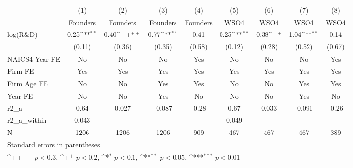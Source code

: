 {
\def\sym#1{\ifmmode^{#1}\else\(^{#1}\)\fi}
\begin{tabular}{l*{8}{c}}
\toprule
                    &\multicolumn{1}{c}{(1)}&\multicolumn{1}{c}{(2)}&\multicolumn{1}{c}{(3)}&\multicolumn{1}{c}{(4)}&\multicolumn{1}{c}{(5)}&\multicolumn{1}{c}{(6)}&\multicolumn{1}{c}{(7)}&\multicolumn{1}{c}{(8)}\\
                    &\multicolumn{1}{c}{Founders}&\multicolumn{1}{c}{Founders}&\multicolumn{1}{c}{Founders}&\multicolumn{1}{c}{Founders}&\multicolumn{1}{c}{WSO4}&\multicolumn{1}{c}{WSO4}&\multicolumn{1}{c}{WSO4}&\multicolumn{1}{c}{WSO4}\\
\midrule
log(R\&D)           &        0.25\sym{**} &        0.40\sym{++} &        0.77\sym{**} &        0.41         &        0.25\sym{**} &        0.38\sym{+}  &        1.04\sym{**} &        0.14         \\
                    &      (0.11)         &      (0.36)         &      (0.35)         &      (0.58)         &      (0.12)         &      (0.28)         &      (0.52)         &      (0.67)         \\
\addlinespace
NAICS4-Year FE      &          No         &          No         &          No         &         Yes         &          No         &          No         &          No         &         Yes         \\
\addlinespace
Firm FE             &         Yes         &         Yes         &         Yes         &         Yes         &         Yes         &         Yes         &         Yes         &         Yes         \\
\addlinespace
Firm Age FE         &          No         &          No         &         Yes         &         Yes         &          No         &          No         &         Yes         &         Yes         \\
\addlinespace
Year FE             &          No         &          No         &         Yes         &          No         &          No         &          No         &         Yes         &          No         \\
\midrule
r2\_a                &        0.64         &       0.027         &      -0.087         &       -0.28         &        0.67         &       0.033         &      -0.091         &       -0.26         \\
r2\_a\_within         &       0.043         &                     &                     &                     &       0.049         &                     &                     &                     \\
N                   &        1206         &        1206         &        1206         &         909         &         467         &         467         &         467         &         389         \\
\bottomrule
\multicolumn{9}{l}{\footnotesize Standard errors in parentheses}\\
\multicolumn{9}{l}{\footnotesize \sym{++} \(p<0.3\), \sym{+} \(p<0.2\), \sym{*} \(p<0.1\), \sym{**} \(p<0.05\), \sym{***} \(p<0.01\)}\\
\end{tabular}
}
